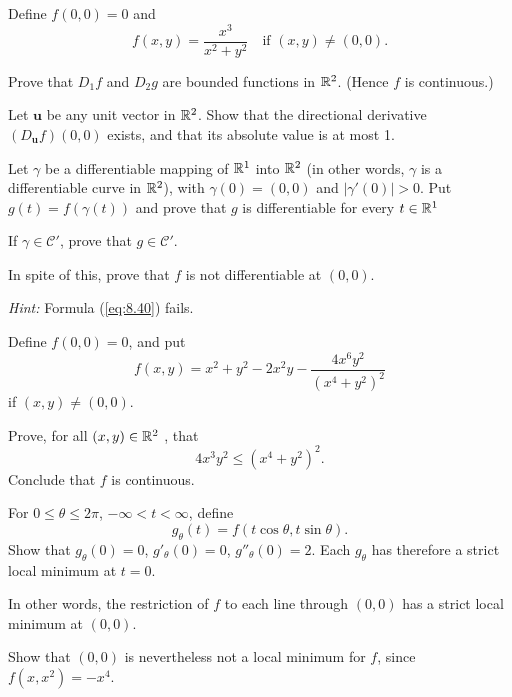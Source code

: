 \begin{myExercise}
    \label{ex:9.14}
    Define $f(0, 0) = 0$ and
    \begin{equation*}
        f(x, y) = \frac{x^3}{x^2+y^2}
        \quad\text{if }(x, y) \neq (0, 0).
    \end{equation*}
    \begin{asparaenum}[(a)]
        \item Prove that $D_1 f$ and $D_2 g$ are bounded functions in ${\protect\mathbb R}^2$. (Hence $f$ is continuous.)
        \item Let $\mathbf{u}$ be any unit vector in ${\protect\mathbb R}^2$. Show that the directional derivative $(D_{\mathbf{u}}f)(0, 0)$ exists, and that its absolute value is at most 1.
        \item Let $\gamma$ be a differentiable mapping of ${\protect\mathbb R}^1$ into ${\protect\mathbb R}^2$ 
        (in other words, $\gamma$ is a differentiable curve in ${\protect\mathbb R}^2$), 
        with $\gamma(0) = (0, 0)$ and $| \gamma'(0) |> 0$. 
        Put $g(t) =  f(\gamma(t))$ and prove that $g$ is differentiable for every $t \in {\protect\mathbb R}^1$

        If $\gamma \in \mathscr{C}'$, prove that $g \in \mathscr{C}'$.
        \item In spite of this, prove that $f$ is not differentiable at $(0, 0)$.
    \end{asparaenum}
    \emph{Hint:} Formula (\ref{eq:8.40}) fails.
\end{myExercise}


\begin{myExercise}
    \label{ex:9.15}
    Define $f(0, 0) = 0$, and put
    \begin{equation*}
        f(x,y)=x^2+y^2-2x^2y-\frac{4x^6y^2}{(x^4+y^2)^2}
    \end{equation*}
    if $(x,y)\neq (0,0)$.
    \begin{asparaenum}[(a)]
        \item Prove, for all $(x, y) \in {\protect\mathbb R}^2$ , that
        \begin{equation*}
            4x^3y^2 \leq (x^4+y^2)^2.
        \end{equation*}
        Conclude that $f$ is continuous.
        \item For $0 \leq \theta \leq 2\pi$, $-\infty < t < \infty$, define
        \begin{equation*}
            g_{\theta}(t) = f(t\cos \theta, t\sin \theta).
        \end{equation*}
        Show that 
        $g_{\theta} (0) = 0$, 
        $g'_{\theta} (0) = 0$, 
        $g''_{\theta} (0) = 2$. 
        Each $g_{\theta}$ has therefore a strict local minimum at $t = 0$.

        In other words, the restriction of $f$ to each line through $(0, 0)$ has a strict local minimum at $(0, 0)$.
        \item Show that $(0, 0)$ is nevertheless not a local minimum for $f$, since $f(x, x^2) = -x^4$.
    \end{asparaenum}
\end{myExercise}


